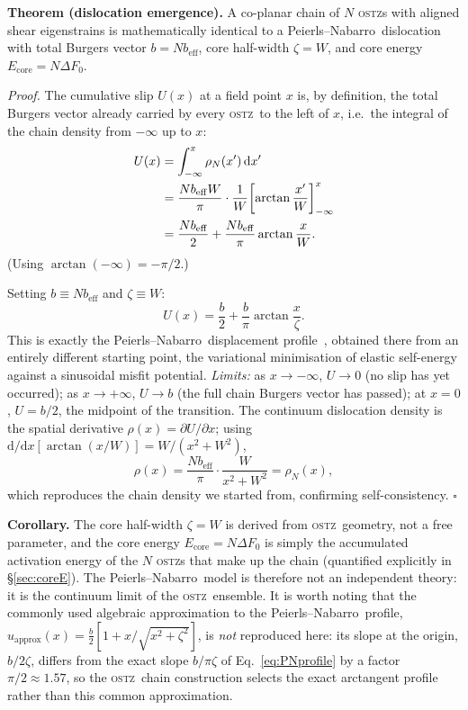 \documentclass[5p,sort&compress]{elsarticle}
\newcommand{\OSTZ}{\textsc{ostz}}
\newcommand{\dF}{\Delta F_0}
\newcommand{\beff}{b_\mathrm{eff}}
\newcommand{\PN}{Peierls--Nabarro}
\begin{document}
\textbf{Theorem (dislocation emergence).} A co-planar chain of $N$
\OSTZ s with aligned shear eigenstrains is mathematically identical
to a \PN\ dislocation with total Burgers vector $b=N\beff$, core
half-width $\zeta=W$, and core energy $E_\text{core}=N\dF$.

\textit{Proof.} The cumulative slip $U(x)$ at a field point $x$ is,
by definition, the total Burgers vector already carried by every
\OSTZ\ to the left of $x$, i.e.\ the integral of the chain density
from $-\infty$ up to $x$:
\begin{align}
  U(x)&=\int_{-\infty}^x\rho_N(x')\,\mathrm dx'\notag\\
  &=\frac{N\beff W}{\pi}\cdot\frac{1}{W}
    \!\left[\arctan\frac{x'}{W}\right]_{-\infty}^x
    \notag\\
  &=\frac{N\beff}{2}+\frac{N\beff}{\pi}\arctan\frac{x}{W}.
  \label{eq:slip}
\end{align}
(Using $\arctan(-\infty)=-\pi/2$.)

Setting $b\equiv N\beff$ and $\zeta\equiv W$:
\begin{equation}
  U(x)=\frac{b}{2}+\frac{b}{\pi}\arctan\frac{x}{\zeta}.
  \label{eq:PNprofile}
\end{equation}
This is exactly the \PN\ displacement profile~\cite{peierls1940,nabarro1947},
obtained there from an entirely different starting point, the
variational minimisation of elastic self-energy against a sinusoidal
misfit potential. \textit{Limits:} as $x\to-\infty$, $U\to0$ (no slip
has yet occurred); as $x\to+\infty$, $U\to b$ (the full chain
Burgers vector has passed); at $x=0$, $U=b/2$, the midpoint of the
transition. The continuum dislocation density is the spatial
derivative $\rho(x)=\partial U/\partial x$; using
$\mathrm d/\mathrm dx[\arctan(x/W)]=W/(x^2+W^2)$,
\[
  \rho(x)=\frac{N\beff}{\pi}\cdot\frac{W}{x^2+W^2}=\rho_N(x),
\]
which reproduces the chain density we started from, confirming
self-consistency. $\square$

\textbf{Corollary.} The core half-width $\zeta=W$ is derived from
\OSTZ\ geometry, not a free parameter, and the core energy
$E_\text{core}=N\dF$ is simply the accumulated activation energy of
the $N$ \OSTZ s that make up the chain (quantified explicitly in
\S\ref{sec:coreE}). The \PN\ model is therefore not an independent
theory: it is the continuum limit of the \OSTZ\ ensemble. It is
worth noting that the commonly used algebraic approximation to the
\PN\ profile, $u_\text{approx}(x)=\tfrac{b}{2}[1+x/\sqrt{x^2+\zeta^2}]$,
is \emph{not} reproduced here: its slope at the origin,
$b/2\zeta$, differs from the exact slope $b/\pi\zeta$ of
Eq.~\eqref{eq:PNprofile} by a factor $\pi/2\approx1.57$, so the
\OSTZ\ chain construction selects the exact arctangent profile
rather than this common approximation.
\end{document}
